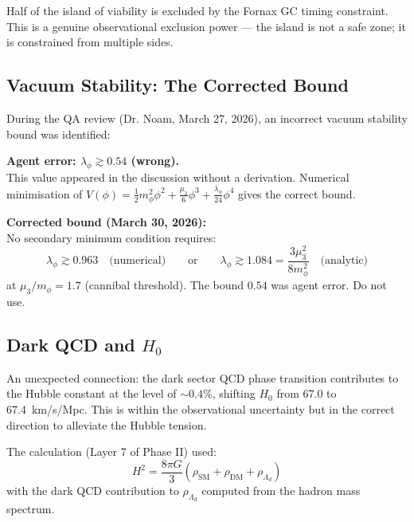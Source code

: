 \documentclass[12pt, a4paper]{article}
\begin{document}
Half of the island of viability is excluded by the Fornax GC timing constraint. This is a genuine observational exclusion power --- the island is not a safe zone; it is constrained from multiple sides.

\subsection{Vacuum Stability: The Corrected Bound}

During the QA review (Dr. Noam, March 27, 2026), an incorrect vacuum stability bound was identified:

\begin{failbox}
\textbf{Agent error: $\lambda_\phi \gtrsim 0.54$ (wrong).}\\
This value appeared in the discussion without a derivation. 
Numerical minimisation of $V(\phi) = \frac{1}{2}m_\phi^2\phi^2 + \frac{\mu_3}{6}\phi^3 + \frac{\lambda_\phi}{24}\phi^4$
gives the correct bound.
\end{failbox}

\begin{successbox}
\textbf{Corrected bound (March 30, 2026):}\\
No secondary minimum condition requires:
\begin{equation}
  \lambda_\phi \gtrsim 0.963 \quad \text{(numerical)}
  \qquad \text{or} \qquad
  \lambda_\phi \gtrsim 1.084 = \frac{3\mu_3^2}{8m_\phi^2} \quad \text{(analytic)}
\end{equation}
at $\mu_3/m_\phi = 1.7$ (cannibal threshold).
The bound $0.54$ was agent error. Do not use.
\end{successbox}

\subsection{Dark QCD and $H_0$}

An unexpected connection: the dark sector QCD phase transition contributes to the Hubble constant at the level of $\sim 0.4\%$, shifting $H_0$ from 67.0 to 67.4~km/s/Mpc. This is within the observational uncertainty but in the correct direction to alleviate the Hubble tension.

The calculation (Layer 7 of Phase II) used:
\begin{equation}
  H^2 = \frac{8\pi G}{3}\left(\rho_\text{SM} + \rho_\text{DM} + \rho_{\Lambda_d}\right)
\end{equation}
with the dark QCD contribution to $\rho_{\Lambda_d}$ computed from the hadron mass spectrum.
\end{document}
